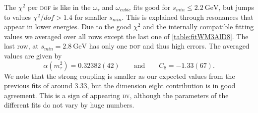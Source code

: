 \documentclass[../../index.tex]{subfiles}
\begin{document}
The \(\chi^2\) per \textsc{dof} is like in the \(\omega_\tau\) and
\(\omega_{cubic}\) fits good for \(s_{min}\leq \SI{2.2}{\giga\eV}\), but jumps
to values \(\chi^2/dof>1.4\) for smaller \(s_{min}\). This is explained through
resonances that appear in lower energies. Due to the good \(\chi^2\) and the
internally compatible fitting values we averaged over all rows except the last
one of \cref{table:fitWM3AlD8}. The last row, at \(s_{min}=\SI{2.8}{\giga\eV}\)
has only one \textsc{dof} and thus high errors. The averaged values are given by
\begin{equation}
  \alpha(m_\tau^2) = 0.32382(42) \qquad \text{and} \qquad C_8=-1.33(67).
\end{equation}
We note that the strong coupling is smaller as our expected values from the
previous fits of around \(3.33\), but the dimension eight contribution is in
good agreement. This is a sign of appearing \textsc{dv}, although the parameters
of the different fits do not vary by huge numbers.
\end{document}
